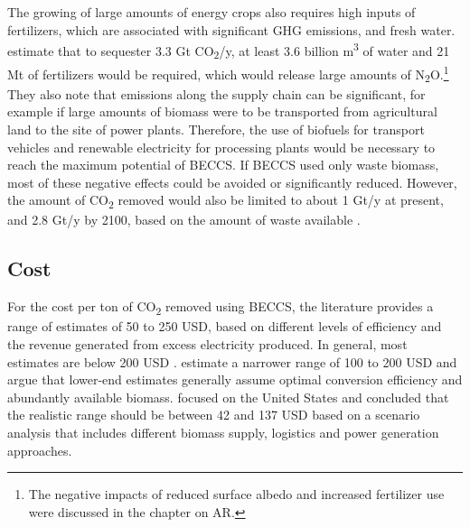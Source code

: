 The growing of large amounts of energy crops also requires high inputs of fertilizers, which are associated with significant GHG emissions, and fresh water. \textcite{Fajardy2017CanEmissions} estimate that to sequester 3.3 Gt CO\textsubscript{2}/y, at least 3.6 billion m\textsuperscript{3} of water and 21 Mt of fertilizers would be required, which would release large amounts of N\textsubscript{2}O.\footnote{The negative impacts of reduced surface albedo and increased fertilizer use were discussed in the chapter on AR.} They also note that emissions along the supply chain can be significant, for example if large amounts of biomass were to be transported from agricultural land to the site of power plants. Therefore, the use of biofuels for transport vehicles and renewable electricity for processing plants would be necessary to reach the maximum potential of BECCS.
If BECCS used only waste biomass, most of these negative effects could be avoided or significantly reduced. However, the amount of CO\textsubscript{2} removed would also be limited to about 1 Gt/y at present, and 2.8 Gt/y by 2100, based on the amount of waste available \parencite{Pour2018PotentialBECCS}.
\subsection*{Cost}
For the cost per ton of CO\textsubscript{2} removed using BECCS, the literature provides a range of estimates of 50 to 250 USD, based on different levels of efficiency and the revenue generated from excess electricity produced. In general, most estimates are below 200 USD \parencite[343]{IPCC2018Global1.5C}. \textcite{Fuss2018NegativeEffects} estimate a narrower range of 100 to 200 USD and argue that lower-end estimates generally assume optimal conversion efficiency and abundantly available biomass. \textcite{Langholtz2020TheUS} focused on the United States and concluded that the realistic range should be between 42 and 137 USD based on a scenario analysis that includes different biomass supply, logistics and power generation approaches.

